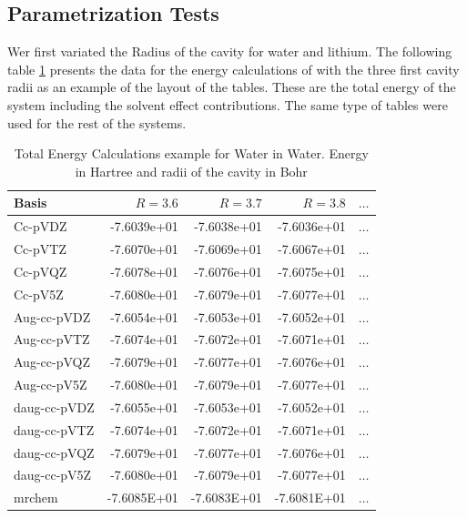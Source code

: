 \documentclass[../master_thesis.tex]{subfiles}
\begin{document}
\subsection{Parametrization Tests}
Wer first variated the Radius of the cavity for water and lithium. The following
table \ref{tab:rawwaterdata}  presents the data for the energy
calculations of  with the three first cavity radii as an example of the layout of the
tables.
These are the total  energy of the system including the solvent effect contributions.
The same type of tables were used for the rest of the systems.
\begin{table}[htbp]
  \caption{Total Energy Calculations example for Water in Water. Energy in Hartree and radii of the cavity in Bohr}
  \begin{center}
    \begin{tabular}{|l|r|r|r|r|}
      \hline
      Basis & $R =3.6$ & $R=3.7$ & $R=3.8$ & $\ldots$\\  \hline
      Cc-pVDZ & -7.6039e+01 & -7.6038e+01 & -7.6036e+01 & $\ldots$\\ \hline
      Cc-pVTZ & -7.6070e+01 & -7.6069e+01 & -7.6067e+01 & $\ldots$\\ \hline
      Cc-pVQZ & -7.6078e+01 & -7.6076e+01 & -7.6075e+01 & $\ldots$\\ \hline
      Cc-pV5Z & -7.6080e+01 & -7.6079e+01 & -7.6077e+01 & $\ldots$\\ \hline
      Aug-cc-pVDZ & -7.6054e+01 & -7.6053e+01 & -7.6052e+01 & $\ldots$\\ \hline
      Aug-cc-pVTZ & -7.6074e+01 & -7.6072e+01 & -7.6071e+01 & $\ldots$\\ \hline
      Aug-cc-pVQZ & -7.6079e+01 & -7.6077e+01 & -7.6076e+01 & $\ldots$\\ \hline
      Aug-cc-pV5Z & -7.6080e+01 & -7.6079e+01 & -7.6077e+01 & $\ldots$\\ \hline
      daug-cc-pVDZ & -7.6055e+01 & -7.6053e+01 & -7.6052e+01 & $\ldots$\\ \hline
      daug-cc-pVTZ & -7.6074e+01 & -7.6072e+01 & -7.6071e+01 & $\ldots$\\ \hline
      daug-cc-pVQZ & -7.6079e+01 & -7.6077e+01 & -7.6076e+01 & $\ldots$\\ \hline
      daug-cc-pV5Z & -7.6080e+01 & -7.6079e+01 & -7.6077e+01 & $\ldots$\\ \hline
      mrchem & -7.6085E+01 & -7.6083E+01 & -7.6081E+01 & $\ldots$\\ \hline
    \end{tabular}
  \end{center}
  \label{tab:rawwaterdata}
\end{table}
\end{document}
